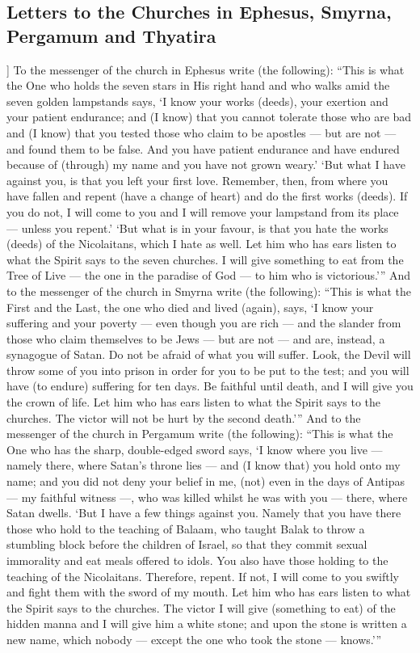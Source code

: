 \begin{pages}
\begin{Leftside}
        			\chapter{Letters to the Churches in Ephesus, Smyrna, Pergamum and Thyatira}
				]
			To the messenger of the church in Ephesus write (the following): “This is what the One who holds the seven stars in His right hand and who walks amid the seven golden lampstands says, ‘I know your works (deeds), your exertion and your patient endurance; and (I know) that you cannot tolerate those who are bad and (I know) that you tested those who claim to be apostles — but are not — and found them to be false. And you have patient endurance and have endured because of (through) my name and you have not grown weary.’ 
		\pend
		\pstart
			‘But what I have against you, is that you left your first love. Remember, then, from where you have fallen and repent (have a change of heart) and do the first works (deeds). If you do not, I will come to you and I will remove your lampstand from its place — unless you repent.’
		\pend
		\pstart
			‘But what is in your favour, is that you hate the works (deeds) of the Nicolaitans, which I hate as well. Let him who has ears listen to what the Spirit says to the seven churches. I will give something to eat from the Tree of Live — the one in the paradise of God — to him who is victorious.’”
		\pend
		\pstart
			And to the messenger of the church in Smyrna write (the following): “This is what the First and the Last, the one who died and lived (again), says, ‘I know your suffering and your poverty — even though you are rich — and the slander from those who claim themselves to be Jews — but are not — and are, instead, a synagogue of Satan. Do not be afraid of what you will suffer. Look, the Devil will throw some of you into prison in order for you to be put to the test; and you will have (to endure) suffering for ten days. Be faithful until death, and I will give you the crown of life. Let him who has ears listen to what the Spirit says to the churches. The victor will not be hurt by the second death.’”
		\pend
		\pstart
			And to the messenger of the church in Pergamum write (the following): “This is what the One who has the sharp, double-edged sword says, ‘I know where you live — namely there, where Satan’s throne lies — and (I know that) you hold onto my name; and you did not deny your belief in me, (not) even in the days of Antipas — my faithful witness —, who was killed whilst he was with you — there, where Satan dwells.
		\pend
		\pstart
			‘But I have a few things against you. Namely that you have there those who hold to the teaching of Balaam, who taught Balak to throw a stumbling block before the children of Israel, so that they commit sexual immorality and eat meals offered to idols. You also have those holding to the teaching of the Nicolaitans. Therefore, repent. If not, I will come to you swiftly and fight them with the sword of my mouth. Let him who has ears listen to what the Spirit says to the churches. The victor I will give (something to eat) of the hidden manna and I will give him a white stone; and upon the stone is written a new name, which nobody — except the one who took the stone — knows.’”

\end{Leftside}
\end{pages}
